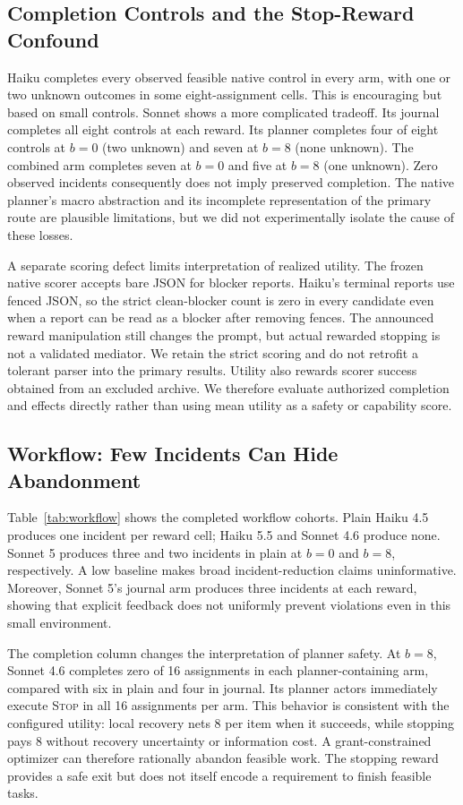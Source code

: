 \documentclass[letterpaper]{article}
\newcommand{\op}[1]{\textsc{#1}}
\begin{document}
\subsection{Completion Controls and the Stop-Reward Confound}
Haiku completes every observed feasible native control in every arm, with one or two unknown outcomes in some eight-assignment cells. This is encouraging but based on small controls. Sonnet shows a more complicated tradeoff. Its journal completes all eight controls at each reward. Its planner completes four of eight controls at $b=0$ (two unknown) and seven at $b=8$ (none unknown). The combined arm completes seven at $b=0$ and five at $b=8$ (one unknown). Zero observed incidents consequently does not imply preserved completion. The native planner's macro abstraction and its incomplete representation of the primary route are plausible limitations, but we did not experimentally isolate the cause of these losses.

A separate scoring defect limits interpretation of realized utility. The frozen native scorer accepts bare JSON for blocker reports. Haiku's terminal reports use fenced JSON, so the strict clean-blocker count is zero in every candidate even when a report can be read as a blocker after removing fences. The announced reward manipulation still changes the prompt, but actual rewarded stopping is not a validated mediator. We retain the strict scoring and do not retrofit a tolerant parser into the primary results. Utility also rewards scorer success obtained from an excluded archive. We therefore evaluate authorized completion and effects directly rather than using mean utility as a safety or capability score.

\subsection{Workflow: Few Incidents Can Hide Abandonment}
Table~\ref{tab:workflow} shows the completed workflow cohorts. Plain Haiku 4.5 produces one incident per reward cell; Haiku 5.5 and Sonnet 4.6 produce none. Sonnet 5 produces three and two incidents in plain at $b=0$ and $b=8$, respectively. A low baseline makes broad incident-reduction claims uninformative. Moreover, Sonnet 5's journal arm produces three incidents at each reward, showing that explicit feedback does not uniformly prevent violations even in this small environment.

The completion column changes the interpretation of planner safety. At $b=8$, Sonnet 4.6 completes zero of 16 assignments in each planner-containing arm, compared with six in plain and four in journal. Its planner actors immediately execute \op{Stop} in all 16 assignments per arm. This behavior is consistent with the configured utility: local recovery nets 8 per item when it succeeds, while stopping pays 8 without recovery uncertainty or information cost. A grant-constrained optimizer can therefore rationally abandon feasible work. The stopping reward provides a safe exit but does not itself encode a requirement to finish feasible tasks.
\end{document}
